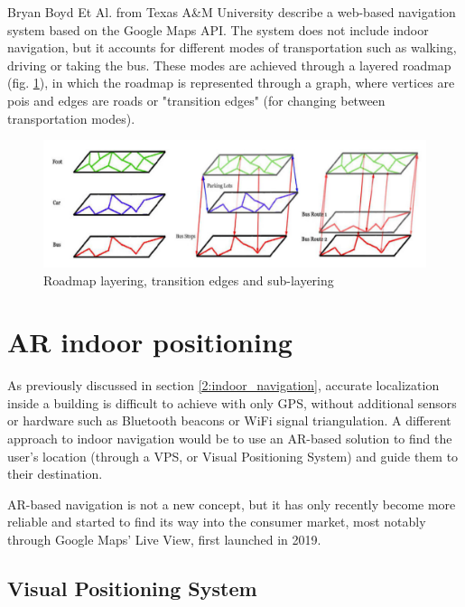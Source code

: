     Bryan Boyd Et Al. \cite{boydcampus} from Texas A\&M University describe a web-based navigation system based on the Google Maps API. The system does not include indoor navigation, but it accounts for different modes of transportation such as walking, driving or taking the bus. These modes are achieved through a layered roadmap (fig. \ref{2:fig:roadmap_layering}), in which the roadmap is represented through a graph, where vertices are \acrshort{poi}s and edges are roads or "transition edges" (for changing between transportation modes).
    
    \begin{figure}[ht]
        \centering
             \includegraphics[width=\textwidth]{figures/roadmap_layering.png}
        \caption{Roadmap layering, transition edges and sub-layering}
        \label{2:fig:roadmap_layering}
    \end{figure}
    
\section{AR indoor positioning} \label{2:ar_indoor_positioning}
        
    As previously discussed in section \ref{2:indoor_navigation}, accurate localization inside a building is difficult to achieve with only GPS, without additional sensors or hardware such as Bluetooth beacons or WiFi signal triangulation. A different approach to indoor navigation would be to use an AR-based solution to find the user’s location (through a VPS, or Visual Positioning System) and guide them to their destination.
    
    AR-based navigation is not a new concept, but it has only recently become more reliable and started to find its way into the consumer market, most notably through Google Maps’ Live View, first launched in 2019\cite{ranieri2020liveview}.
    
        \subsection{Visual Positioning System} \label{2:visual_positioning_system}
        

